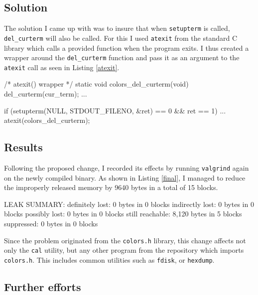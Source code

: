 \documentclass[a4paper,10pt,twocolumn,english]{article}
\begin{document}
\subsection{Solution}

The solution I came up with was to insure that when \lstinline{setupterm} is called, \lstinline{del_curterm} will also be called. For this I used \lstinline{atexit} from the standard C library which calls a provided function when the program exits. I thus created a wrapper around the \lstinline{del_curterm} function and pass it as an argument to the \lstinline{atexit} call as seen in Listing \ref{atexit}.

\begin{code}[language=c, basicstyle=\ttfamily\small,
    caption=Wrapper for atexit, label=atexit]
/* atexit() wrapper */
static void colors_del_curterm(void)
{
	del_curterm(cur_term);
}
...

if (setupterm(NULL, STDOUT_FILENO, &ret) == 0
        && ret == 1) {
    ...
    atexit(colors_del_curterm);
}
\end{code}

\subsection{Results}

Following the proposed change, I recorded its effects by running \lstinline{valgrind} again on the newly compiled binary. As shown in Listing \ref{final}, I managed to reduce the improperly released memory by 9640 bytes in a total of 15 blocks.

\begin{code}[basicstyle=\ttfamily\small,
    caption=Leak Summary after changes, label=final]
LEAK SUMMARY:
   definitely lost: 0 bytes in 0 blocks
   indirectly lost: 0 bytes in 0 blocks
     possibly lost: 0 bytes in 0 blocks
   still reachable: 8,120 bytes in 5 blocks
        suppressed: 0 bytes in 0 blocks
\end{code}

Since the problem originated from the \lstinline{colors.h} library, this change affects not only the \lstinline{cal} utility, but any other program from the repository which imports \lstinline{colors.h}. This includes common utilities such as \lstinline{fdisk}, or \lstinline{hexdump}.

\subsection{Further efforts}
\end{document}
